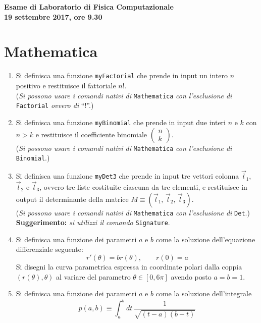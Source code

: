 \documentclass[12pt]{article}
\newcommand{\be}{\begin{equation}}
\newcommand{\ee}{\end{equation}}
\begin{document}
\begin{center}
{\Large\bf Esame di Laboratorio di Fisica Computazionale }\\
{\bf 19 settembre 2017, ore 9.30}
\end{center}



\section{Mathematica}
\begin{enumerate}

\item
  Si definisca una funzione {\tt myFactorial} che prende in input
  un intero $n$ positivo e restituisce il fattoriale $n!$.\\
({\it Si possono usare i comandi nativi di} {\tt Mathematica}
{\it con l'esclusione di} {\tt Factorial} {\it ovvero di} ``!''.)

\item
  Si definisca una funzione {\tt myBinomial} che prende in input
  due interi $n$ e $k$ con $n>k$ e restituisce il coefficiente binomiale
  $\left(\begin{array}{c} n\\k \end{array}  \right)$.\\
({\it Si possono usare i comandi nativi di} {\tt Mathematica}
{\it con l'esclusione di} {\tt Binomial}.)

\item
Si definisca una funzione {\tt myDet3}
che prende in input tre vettori colonna $\vec l_1$, $\vec l_2$ e $\vec l_3$,
ovvero tre liste costituite ciascuna da tre elementi,
e restituisce in output il determinante della matrice
$M\equiv \left( \vec l_1,\, \vec l_2,\, \vec l_3\right)$.\\
({\it Si possono usare i comandi nativi di} {\tt Mathematica}
{\it con l'esclusione di} {\tt Det}.)\\
{\bf Suggerimento:} {\it si utilizzi il comando} {\tt Signature}.


\item
  Si definisca una funzione dei parametri $a$ e $b$ come la soluzione dell'equazione differenziale seguente:
\be
r'(\theta) = b r(\theta),\quad\quad r(0) = a   
\label{eq:eqdiff}
\ee
Si disegni la curva parametrica espressa in coordinate polari dalla coppia
$(r(\theta), \theta)$ al variare del parametro $\theta\in [0,6\pi]$
avendo posto $a=b=1$.


\item
  Si definisca una funzione dei parametri $a$ e $b$ come la soluzione dell'integrale
  \be
p(a,b) \equiv \int_a^b dt\,\frac{1}{\sqrt{(t-a)(b-t)}}
  \ee


\end{enumerate}
\end{document}
